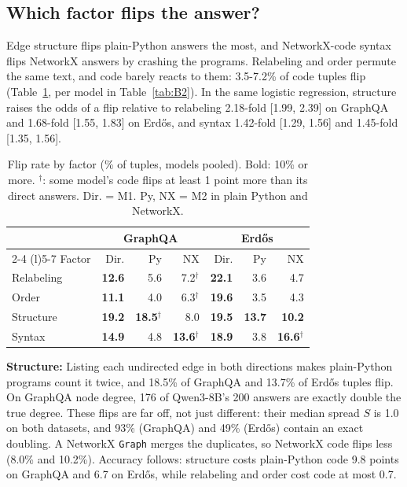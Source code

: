 \documentclass[11pt]{article}
\begin{document}
\subsection{Which factor flips the answer?}\label{sec:factor-results}

Edge structure flips plain-Python answers the most, and NetworkX-code syntax flips NetworkX answers by crashing the programs. Relabeling and order permute the same text, and code barely reacts to them: 3.5-7.2\% of code tuples flip (Table~\ref{tab:2}, per model in Table~\ref{tab:B2}). In the same logistic regression, structure raises the odds of a flip relative to relabeling 2.18-fold [1.99, 2.39] on GraphQA and 1.68-fold [1.55, 1.83] on Erdős, and syntax 1.42-fold [1.29, 1.56] and 1.45-fold [1.35, 1.56].

\begin{table}[t]
\centering
\small\setlength{\tabcolsep}{3.2pt}
\begin{tabular}{@{}lrrrrrr@{}}
\toprule
 & \multicolumn{3}{c}{GraphQA} & \multicolumn{3}{c}{Erd\H{o}s} \\
\cmidrule(lr){2-4} \cmidrule(l){5-7}
Factor & Dir. & Py & NX & Dir. & Py & NX \\
\midrule
Relabeling & \textbf{12.6} & 5.6 & 7.2$^\dagger$ & \textbf{22.1} & 3.6 & 4.7 \\
Order & \textbf{11.1} & 4.0 & 6.3$^\dagger$ & \textbf{19.6} & 3.5 & 4.3 \\
Structure & \textbf{19.2} & \textbf{18.5}$^\dagger$ & 8.0 & \textbf{19.5} & \textbf{13.7} & \textbf{10.2} \\
Syntax & \textbf{14.9} & 4.8 & \textbf{13.6}$^\dagger$ & \textbf{18.9} & 3.8 & \textbf{16.6}$^\dagger$ \\
\bottomrule
\end{tabular}
\caption[Flip rate by factor]{ Flip rate by factor (\% of tuples, models pooled). Bold: 10\% or more. $^\dagger$: some model's code flips at least 1 point more than its direct answers. Dir. = M1. Py, NX = M2 in plain Python and NetworkX.}
\label{tab:2}
\end{table}

\textbf{Structure:} Listing each undirected edge in both directions makes plain-Python programs count it twice, and 18.5\% of GraphQA and 13.7\% of Erdős tuples flip. On GraphQA node degree, 176 of Qwen3-8B's 200 answers are exactly double the true degree. These flips are far off, not just different: their median spread $S$ is 1.0 on both datasets, and 93\% (GraphQA) and 49\% (Erdős) contain an exact doubling. A NetworkX \texttt{Graph} merges the duplicates, so NetworkX code flips less (8.0\% and 10.2\%). Accuracy follows: structure costs plain-Python code 9.8 points on GraphQA and 6.7 on Erdős, while relabeling and order cost code at most 0.7.
\end{document}
